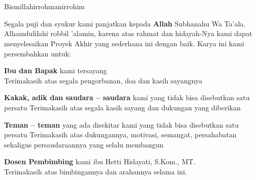 \chapter*{\Persembahan}
\begin{center}
Bismillahirrohmanirrohim
\end{center}
\begin{center}
Segala puji dan syukur kami panjatkan kepada \textbf{Allah} Subhanahu Wa Ta’ala. Alhamdulilahi robbil ’alamin, karena atas rahmat dan hidayah-Nya kami dapat menyelesaikan Proyek Akhir yang sederhana ini dengan baik. Karya ini kami persembahkan untuk:
\end{center}

\begin{center}
\textbf{Ibu dan Bapak} kami tersayang
\\
Terimakasih atas segala pengorbanan, doa dan kasih sayangnya
\end{center}


\begin{center}
\textbf{Kakak, adik dan saudara – saudara} kami yang tidak bisa disebutkan satu persatu
Terimakasih atas segala kasih sayang dan dukungan yang diberikan
\end{center}

\begin{center}
\textbf{Teman – teman} yang ada disekitar kami yang tidak bisa disebutkan satu persatu
Terimakasih atas dukungannya, motivasi, semangat, persahabatan sekaligus persaudaraannya yang selalu membangun
\end{center}

\begin{center}
\textbf{Dosen Pembimbing} kami ibu Hetti Hidayati, S.Kom., MT.
\\
Terimakasih atas bimbingannya dan arahannya selama ini.
\end{center}

